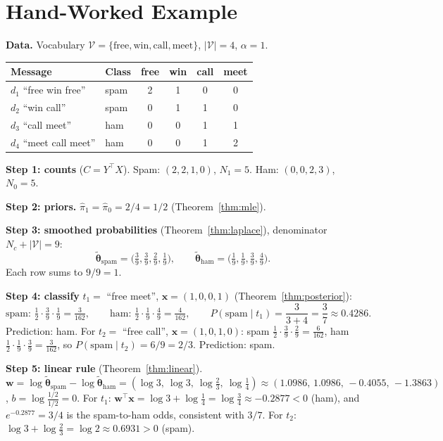 \documentclass[11pt]{article}
\theoremstyle{plain}
\theoremstyle{definition}
\newcommand{\V}{\mathcal{V}}
\newcommand{\Vs}{|\mathcal{V}|}
\newcommand{\bx}{\mathbf{x}}
\newcommand{\bw}{\mathbf{w}}
\begin{document}
\section{Hand-Worked Example}\label{app:hand}
\textbf{Data.} Vocabulary $\V=\{\text{free},\text{win},\text{call},\text{meet}\}$, $\Vs=4$, $\alpha=1$.
\begin{center}
\begin{tabular}{@{}llcccc@{}}
\toprule
Message & Class & free & win & call & meet\\
\midrule
$d_1$ ``free win free'' & spam & 2 & 1 & 0 & 0\\
$d_2$ ``win call'' & spam & 0 & 1 & 1 & 0\\
$d_3$ ``call meet'' & ham & 0 & 0 & 1 & 1\\
$d_4$ ``meet call meet'' & ham & 0 & 0 & 1 & 2\\
\bottomrule
\end{tabular}
\end{center}

\textbf{Step 1: counts} ($C=Y^\top X$). Spam: $(2,2,1,0)$, $N_1=5$. Ham: $(0,0,2,3)$, $N_0=5$.

\textbf{Step 2: priors.} $\hat\pi_1=\hat\pi_0=2/4=1/2$ (Theorem~\ref{thm:mle}).

\textbf{Step 3: smoothed probabilities} (Theorem~\ref{thm:laplace}), denominator $N_c+\Vs=9$:
\[
\tilde{\boldsymbol\theta}_{\text{spam}}=\Big(\tfrac39,\tfrac39,\tfrac29,\tfrac19\Big),\qquad
\tilde{\boldsymbol\theta}_{\text{ham}}=\Big(\tfrac19,\tfrac19,\tfrac39,\tfrac49\Big).
\]
Each row sums to $9/9=1$.

\textbf{Step 4: classify} $t_1=$ ``free meet'', $\bx=(1,0,0,1)$ (Theorem~\ref{thm:posterior}):
\[
\text{spam: }\tfrac12\cdot\tfrac39\cdot\tfrac19=\tfrac{3}{162},\qquad
\text{ham: }\tfrac12\cdot\tfrac19\cdot\tfrac49=\tfrac{4}{162},\qquad
P(\text{spam}\mid t_1)=\frac{3}{3+4}=\frac37\approx0.4286.
\]
Prediction: ham. For $t_2=$ ``free call'', $\bx=(1,0,1,0)$: spam $\tfrac12\cdot\tfrac39\cdot\tfrac29=\tfrac6{162}$,
ham $\tfrac12\cdot\tfrac19\cdot\tfrac39=\tfrac3{162}$, so $P(\text{spam}\mid t_2)=6/9=2/3$. Prediction: spam.

\textbf{Step 5: linear rule} (Theorem~\ref{thm:linear}).
$\bw=\log\tilde{\boldsymbol\theta}_{\text{spam}}-\log\tilde{\boldsymbol\theta}_{\text{ham}}
=(\log3,\ \log3,\ \log\tfrac23,\ \log\tfrac14)\approx(1.0986,\,1.0986,\,-0.4055,\,-1.3863)$, $b=\log\frac{1/2}{1/2}=0$.
For $t_1$: $\bw^\top\bx=\log3+\log\frac14=\log\frac34\approx-0.2877<0$ (ham), and
$e^{-0.2877}=3/4$ is the spam-to-ham odds, consistent with $3/7$. For $t_2$:
$\log3+\log\frac23=\log2\approx0.6931>0$ (spam).
\end{document}
